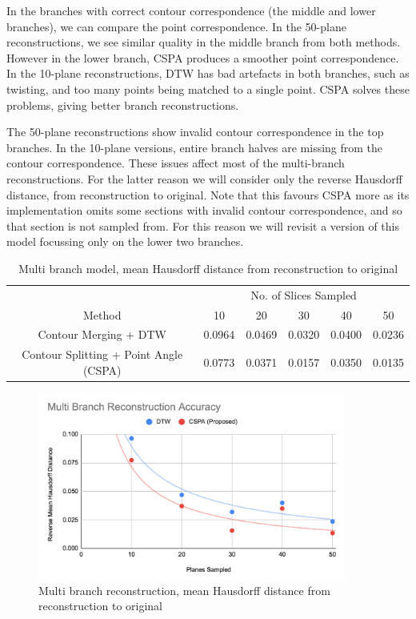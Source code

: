 \documentclass[11p, titlepage]{article}
\begin{document}
In the branches with correct contour correspondence (the middle and lower branches), we can compare the point correspondence. In the 50-plane reconstructions, we see similar quality in the middle branch from both methods. However in the lower branch, CSPA produces a smoother point correspondence. In the 10-plane reconstructions, DTW has bad artefacts in both branches, such as twisting, and too many points being matched to a single point. CSPA solves these problems, giving better branch reconstructions.

The 50-plane reconstructions show invalid contour correspondence in the top branches. In the 10-plane versions, entire branch halves are missing from the contour correspondence. These issues affect most of the multi-branch reconstructions. For the latter reason we will consider only the reverse Hausdorff distance, from reconstruction to original. Note that this favours CSPA more as its implementation omits some sections with invalid contour correspondence, and so that section is not sampled from. For this reason we will revisit a version of this model focussing only on the lower two branches.

\begin{table}[h!]
\begin{tabular}{ | c | c | c | c | c | c | }
\hline
& \multicolumn{5}{c|}{No. of Slices Sampled} \\
\cline{2-6}
Method & 10 & 20 & 30 & 40 & 50 \\
\hline
Contour Merging + DTW & 0.0964 & 0.0469 & 0.0320 & 0.0400 & 0.0236 \\
Contour Splitting + Point Angle (CSPA) & 0.0773 & 0.0371 & 0.0157 & 0.0350 & 0.0135 \\
\hline
\end{tabular}
\caption{Multi branch model, mean Hausdorff distance from reconstruction to original}
\label{table:multi_branch_reverse}
\end{table}
\FloatBarrier

\begin{figure}[h!]
\centering
\includegraphics[width=0.9\textwidth]{graphs/multi-branch-reverse}
\caption{Multi branch reconstruction, mean Hausdorff distance from reconstruction to original\label{fig:multi_branch_reverse_graph}}
\end{figure}
\end{document}
